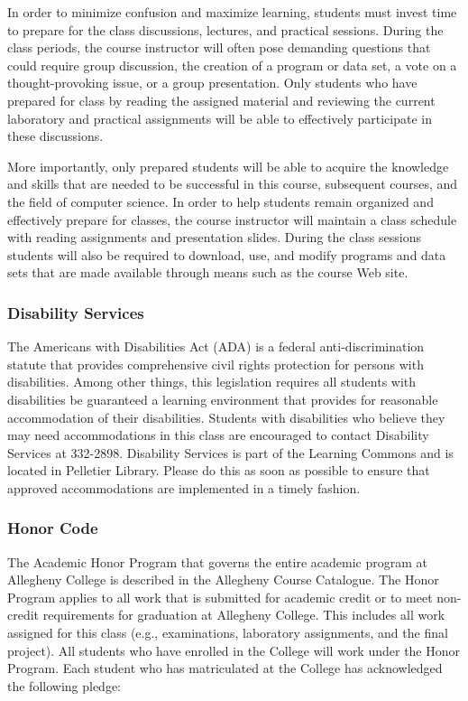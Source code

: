 In order to minimize confusion and maximize learning, students must invest time to prepare for the class discussions,
lectures, and practical sessions.  During the class periods, the course instructor will often pose demanding questions
that could require group discussion, the creation of a program or data set, a vote on a thought-provoking issue, or a
group presentation.  Only students who have prepared for class by reading the assigned material and reviewing the
current laboratory and practical assignments will be able to effectively participate in these discussions.

More importantly, only prepared students will be able to acquire the knowledge and skills that are needed to be
successful in this course, subsequent courses, and the field of computer science.  In order to help students remain
organized and effectively prepare for classes, the course instructor will maintain a class schedule with reading
assignments and presentation slides.   During the class sessions students will also be required to download, use, and
modify programs and data sets that are made available through means such as the course Web site.

\subsubsection*{Disability Services}

The Americans with Disabilities Act (ADA) is a federal anti-discrimination statute that provides comprehensive civil
rights protection for persons with disabilities.  Among other things, this legislation requires all students with
disabilities be guaranteed a learning environment that provides for reasonable accommodation of their disabilities.
Students with disabilities who believe they may need accommodations in this class are encouraged to contact Disability
Services at 332-2898.  Disability Services is part of the Learning Commons and is located in Pelletier Library.
Please do this as soon as possible to ensure that approved accommodations are implemented in a timely fashion.

\subsubsection*{Honor Code}

The Academic Honor Program that governs the entire academic program at Allegheny College is described in the Allegheny
Course Catalogue.  The Honor Program applies to all work that is submitted for academic credit or to meet non-credit
requirements for graduation at Allegheny College.  This includes all work assigned for this class (e.g., examinations,
  laboratory assignments, and the final project).  All students who have enrolled in the College will work under the Honor
Program.  Each student who has matriculated at the College has acknowledged the following pledge:

